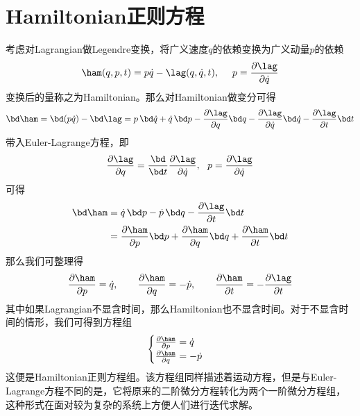 \section{Hamiltonian正则方程}
\label{sec:cannoical_eqs}
考虑对Lagrangian做Legendre变换，将广义速度$\dot q$的依赖变换为广义动量$p$的依赖
\begin{equation}
    \ham(q,p,t) = p\dot q - \lag(q,\dot q, t),~~~~p = \frac{\partial\lag}{\partial\dot q}
\end{equation}
变换后的量称之为Hamiltonian。那么对Hamiltonian做变分可得
\begin{equation}\begin{split}
     \bd \ham = \bd(p\dot q) - \bd \lag=p\,\bd\dot q + \dot q\, \bd p-\frac{\partial\lag}{\partial q}\bd q -\frac{\partial\lag}{\partial\dot q}\bd \dot q - \frac{\partial\lag}{\partial t}\bd t\\
\end{split}
\end{equation}
带入Euler-Lagrange方程，即
\begin{equation}
    \frac{\partial\lag}{\partial q} = \frac{\bd}{\bd t}\frac{\partial\lag}{\partial\dot q},~~p = \frac{\partial\lag}{\partial\dot q}
\end{equation}
可得
\begin{equation}
    \begin{split}
       \bd\ham & = \dot q 
       \,\bd p - \dot p \,\bd q-\frac{\partial\lag}{\partial t}\bd t\\&=\frac{\partial\ham}{\partial p}\bd p +  \frac{\partial\ham}{\partial q}\bd q + \frac{\partial\ham}{\partial t}\bd t
    \end{split}
\end{equation}
那么我们可整理得
\begin{equation}
    \frac{\partial\ham}{\partial p} = \dot{q},\qquad\frac{\partial \ham}{\partial q} = -\dot{p},\qquad \frac{\partial\ham}{\partial t} = -\frac{\partial\lag}{\partial t}
\end{equation}
其中如果Lagrangian不显含时间，那么Hamiltonian也不显含时间。对于不显含时间的情形，我们可得到方程组
\begin{equation}
    \begin{cases}
        \frac{\partial\ham}{\partial p} = \dot{q}\\
        \frac{\partial \ham}{\partial q} = -\dot{p}
    \end{cases}
\end{equation}
这便是Hamiltonian正则方程组。该方程组同样描述着运动方程，但是与Euler-Lagrange方程不同的是，它将原来的二阶微分方程转化为两个一阶微分方程组，这种形式在面对较为复杂的系统上方便人们进行迭代求解。

